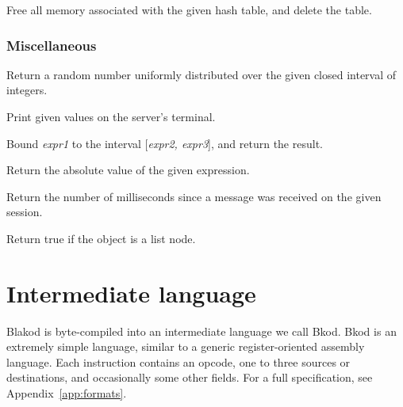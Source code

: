 Free all memory associated with the given hash table, and delete the
table.

\subsubsection{Miscellaneous}

\begin{leftlines}
\end{leftlines}

Return a random number uniformly distributed over the given closed
interval of integers.

\begin{leftlines}
\end{leftlines}

Print given values on the server's terminal.

\begin{leftlines}
\end{leftlines}

Bound {\em expr1} to the interval [{\em expr2, expr3}], and return
the result.

\begin{leftlines}
\end{leftlines}

Return the absolute value of the given expression.

\begin{leftlines}
\end{leftlines}

Return the number of milliseconds since a message was received on the
given session.

\begin{leftlines}
\end{leftlines}

Return true if the object is a list node.

\section{Intermediate language}

Blakod is byte-compiled into an intermediate language we call Bkod.
Bkod is an extremely simple language, similar to a generic
register-oriented assembly language.  Each instruction contains an
opcode, one to three sources or destinations, and occasionally some
other fields. For a full specification, see Appendix~\ref{app:formats}.

